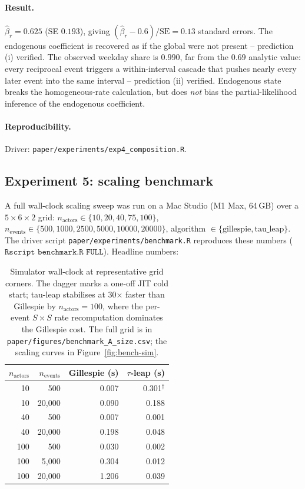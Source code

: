 \documentclass[11pt,a4paper]{article}
\begin{document}
\paragraph{Result.}
$\hat\beta_r = 0.625$ (SE $0.193$), giving
$(\hat\beta_r - 0.6)/\text{SE} = 0.13$ standard errors. The
endogenous coefficient is recovered as if the global were not
present -- prediction (i) verified. The observed weekday share
is $0.990$, far from the $0.69$ analytic value: every reciprocal
event triggers a within-interval cascade that pushes nearly
every later event into the same interval -- prediction (ii)
verified. Endogenous state breaks the homogeneous-rate
calculation, but does \emph{not} bias the partial-likelihood
inference of the endogenous coefficient.

\paragraph{Reproducibility.}
Driver: \texttt{paper/experiments/exp4\_composition.R}.

\subsection{Experiment 5: scaling benchmark}\label{sec:bench}

A full wall-clock scaling sweep was run on a Mac Studio
(M1 Max, 64\,GB) over a $5 \times 6 \times 2$ grid:
$n_\text{actors} \in \{10, 20, 40, 75, 100\}$,
$n_\text{events} \in \{500, 1000, 2500, 5000, 10000, 20000\}$,
algorithm $\in \{\text{gillespie}, \text{tau\_leap}\}$. The
driver script
\texttt{paper/experiments/benchmark.R} reproduces these numbers
($\texttt{Rscript benchmark.R FULL}$). Headline numbers:

\begin{table}[h]
\centering
\small
\begin{tabular}{rrrr}
\toprule
$n_\text{actors}$ & $n_\text{events}$ & Gillespie (s) & $\tau$-leap (s) \\
\midrule
 10 &     500 & 0.007 & 0.301$^{\dagger}$ \\
 10 &  20{,}000 & 0.090 & 0.188 \\
 40 &     500 & 0.007 & 0.001 \\
 40 &  20{,}000 & 0.198 & 0.048 \\
 100 &    500 & 0.030 & 0.002 \\
 100 &  5{,}000 & 0.304 & 0.012 \\
 100 & 20{,}000 & 1.206 & 0.039 \\
\bottomrule
\end{tabular}
\caption{Simulator wall-clock at representative grid corners.
The dagger marks a one-off JIT cold start; tau-leap stabilises at
30$\times$ faster than Gillespie by $n_\text{actors} = 100$, where
the per-event $S \times S$ rate recomputation dominates the
Gillespie cost. The full grid is in
\texttt{paper/figures/benchmark\_A\_size.csv}; the scaling curves
in Figure~\ref{fig:bench-sim}.}
\label{tab:bench}
\end{table}
\end{document}
